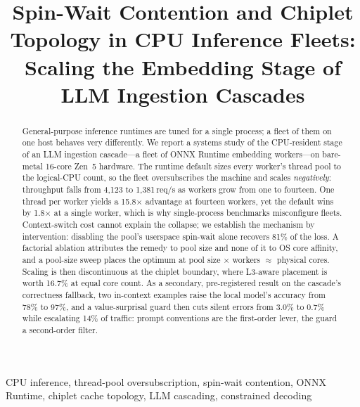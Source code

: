 \documentclass[conference]{IEEEtran}
\begin{document}
\title{Spin-Wait Contention and Chiplet Topology in CPU Inference Fleets: Scaling the Embedding Stage of LLM Ingestion Cascades}

\author{
}

\maketitle
\sloppy

\begin{abstract}
General-purpose inference runtimes are tuned for a single process; a fleet of them on one host behaves very differently. We report a systems study of the CPU-resident stage of an LLM ingestion cascade---a fleet of ONNX Runtime embedding workers---on bare-metal 16-core Zen~5 hardware. The runtime default sizes every worker's thread pool to the logical-CPU count, so the fleet oversubscribes the machine and scales \emph{negatively}: throughput falls from 4{,}123 to 1{,}381\,req/s as workers grow from one to fourteen. One thread per worker yields a 15.8$\times$ advantage at fourteen workers, yet the default wins by 1.8$\times$ at a single worker, which is why single-process benchmarks misconfigure fleets. Context-switch cost cannot explain the collapse; we establish the mechanism by intervention: disabling the pool's userspace spin-wait alone recovers 81\% of the loss. A factorial ablation attributes the remedy to pool size and none of it to OS core affinity, and a pool-size sweep places the optimum at pool size $\times$ workers $\approx$ physical cores. Scaling is then discontinuous at the chiplet boundary, where L3-aware placement is worth 16.7\% at equal core count. As a secondary, pre-registered result on the cascade's correctness fallback, two in-context examples raise the local model's accuracy from 78\% to 97\%, and a value-surprisal guard then cuts silent errors from 3.0\% to 0.7\% while escalating 14\% of traffic: prompt conventions are the first-order lever, the guard a second-order filter.
\end{abstract}

\begin{IEEEkeywords}
CPU inference, thread-pool oversubscription, spin-wait contention, ONNX Runtime, chiplet cache topology, LLM cascading, constrained decoding
\end{IEEEkeywords}
\end{document}
